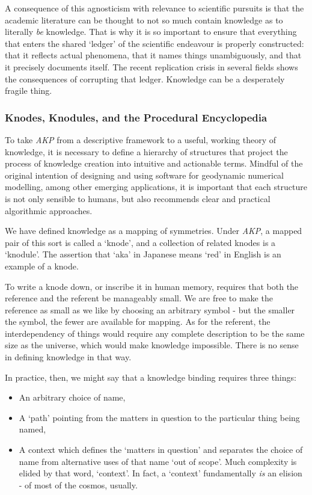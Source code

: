 \documentclass[a4paper,11pt,oneside]{book}
\begin{document}
A consequence of this agnosticism with relevance to scientific pursuits is that the academic literature can be thought to not so much contain knowledge as to literally \textit{be} knowledge. That is why it is so important to ensure that everything that enters the shared `ledger' of the scientific endeavour is properly constructed: that it reflects actual phenomena, that it names things unambiguously, and that it precisely documents itself. The recent replication crisis in several fields shows the consequences of corrupting that ledger. Knowledge can be a desperately fragile thing.

\subsubsection{Knodes, Knodules, and the Procedural Encyclopedia}

To take \textit{AKP} from a descriptive framework to a useful, working theory of knowledge, it is necessary to define a hierarchy of structures that project the process of knowledge creation into intuitive and actionable terms. Mindful of the original intention of designing and using software for geodynamic numerical modelling, among other emerging applications, it is important that each structure is not only sensible to humans, but also recommends clear and practical algorithmic approaches.

We have defined knowledge as a mapping of symmetries. Under \textit{AKP}, a mapped pair of this sort is called a `knode', and a collection of related knodes is a `knodule'. The assertion that `aka' in Japanese means `red' in English is an example of a knode.

To write a knode down, or inscribe it in human memory, requires that both the reference and the referent be manageably small. We are free to make the reference as small as we like by choosing an arbitrary symbol - but the smaller the symbol, the fewer are available for mapping. As for the referent, the interdependency of things would require any complete description to be the same size as the universe, which would make knowledge impossible. There is no sense in defining knowledge in that way.

In practice, then, we might say that a knowledge binding requires three things:

\begin{itemize}
\item An arbitrary choice of name,
\item A `path' pointing from the matters in question to the particular thing being named,
\item A context which defines the `matters in question' and separates the choice of name from alternative uses of that name `out of scope'.
Much complexity is elided by that word, `context'. In fact, a `context' fundamentally \textit{is} an elision - of most of the cosmos, usually.
\end{itemize}
\end{document}
